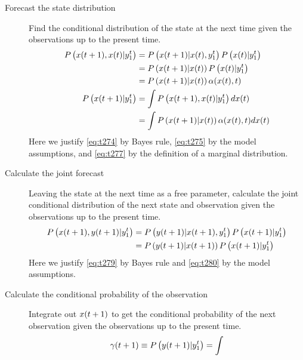 \begin{description}
\item[Forecast the state distribution]  Find the
  conditional distribution of the state at the next time given the
  observations up to the present time.
\begin{align}
  \label{eq:t274}
  P\left({x}{(t+1)},{x}{(t)}|y_{1}^{t} \right) &=
  P\left({x}{(t+1)}|{x}{(t)},y_{1}^{t} \right)
  P\left({x}{(t)}|y_{1}^{t} \right) \\
  \label{eq:t275}
  &= P\left({x}{(t+1)}|{x}{(t)} \right)
  P\left({x}{(t)}|y_{1}^{t} \right) \\
  &= P\left({x}{(t+1)}|{x}{(t)} \right)
  \alpha({x}{(t)},t)\\
  \label{eq:t277}
  P\left({x}{(t+1)}|y_{1}^{t} \right) &= \int
  P\left({x}{(t+1)},{x}{(t)}|y_{1}^{t} \right) d{x}{(t)}\\
  \label{eq:IFore}
  &= \int P \left({x}{(t+1)}|{x}{(t)} \right)
  \alpha({x}{(t)},t) d{x}{(t)}
\end{align}
Here we justify \eqref{eq:t274} by Bayes rule, \eqref{eq:t275} by
the model assumptions, and \eqref{eq:t277} by the definition of a
marginal distribution.
\item[Calculate the joint forecast] Leaving the state at the next time
  as a free parameter, calculate the joint conditional distribution of
  the next state and observation given the observations up to the
  present time.
\begin{align}
  \label{eq:t279}
  P\left({x}{(t+1)},{y}{(t+1)}|y_{1}^{t} \right) &=
  P\left({y}{(t+1)}|{x}{(t+1)},y_{1}^{t} \right)
  P\left({x}{(t+1)}|y_{1}^{t} \right) \\
  \label{eq:t280}
  &=P\left({y}{(t+1)}|{x}{(t+1)} \right)
  P\left({x}{(t+1)}|y_{1}^{t} \right)
\end{align}
Here we justify \eqref{eq:t279} by Bayes rule and \eqref{eq:t280} by
the model assumptions.
\item[Calculate the conditional probability of the observation]
  Integrate out ${x}{(t+1)}$ to get the conditional probability of
  the next observation given the observations up to the present time.
\begin{equation}
  \label{eq:Igamma}
  \ti{\gamma}{t+1} \equiv P\left(\ti{y}{t+1}|\ts{y}{1}{t} \right) = \int

\end{equation}
\end{description}
